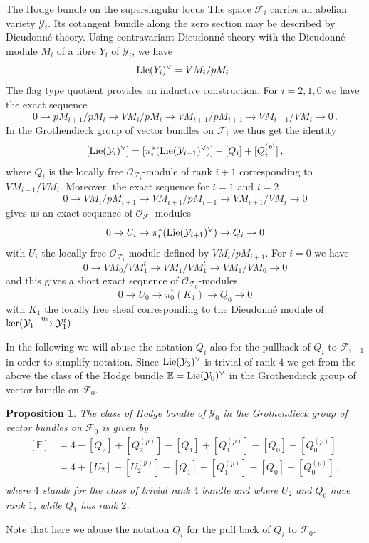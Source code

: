 \documentclass[11pt]{amsart}
\numberwithin{equation}{section}
\newcommand{\EE}{\mathbb E}
\newcommand\langepijl[1]{\buildrel {#1} \over \longrightarrow}
\newtheorem{proposition}[theorem]{Proposition}
\theoremstyle{definition}
\theoremstyle{remark}
\begin{document}
\begin{section}{The Hodge bundle on the supersingular locus}
The space $\mathcal{F}_i$ carries an abelian variety $\mathcal{Y}_i$.
Its cotangent bundle along the zero section may be described by Dieudonn\'e
theory. Using contravariant Dieudonn\'e theory with the Dieudonn\'e module $M_i$
of a fibre $Y_i$ of $\mathcal{Y}_i$, we have
$$
{\rm Lie}(Y_i)^{\vee}=VM_i/pM_i\, .
$$
The flag type quotient provides an inductive construction.
For $i=2,1,0$ we have the
exact sequence
$$
0 \to pM_{i+1}/pM_i \to VM_i/pM_i \to VM_{i+1}/pM_{i+1} \to VM_{i+1}/VM_i \to 0 \, .
$$
In the Grothendieck group of vector bundles on $\mathcal{F}_i$ we thus get the identity
$$
[{\rm Lie}(\mathcal{Y}_i)^{\vee}]=[\pi_i^*({\rm Lie}(\mathcal{Y}_{i+1})^{\vee})] - [Q_i] + [Q_i^{(p)}]\, ,
$$
where $Q_i$ is the locally free $\mathcal{O}_{\mathcal{F}_i}$-module
of rank $i+1$ corresponding to $VM_{i+1}/VM_i$.
Moreover, the exact sequence for $i=1$ and $i=2$
$$
0 \to VM_i/pM_{i+1} \to VM_{i+1}/pM_{i+1} \to VM_{i+1}/VM_i \to 0
$$
gives us an exact sequence of $\mathcal{O}_{\mathcal{F}_i}$-modules
$$
0 \to U_i \to \pi_i^*({\rm Lie}(\mathcal{Y}_{i+1})^{\vee}) \to Q_i \to 0
$$
with $U_i$ the locally free $\mathcal{O}_{\mathcal{F}_i}$-module
defined by  $VM_i/pM_{i+1}$. For $i=0$ we have
$$
0 \to VM_0/VM_1^t \to VM_1/VM_1^t \to VM_1/VM_0 \to 0
$$
and this gives a short exact sequence of $\mathcal{O}_{\mathcal{F}_0}$-modules
$$
0 \to U_0 \to \pi_0^*(K_1) \to Q_0 \to 0
$$
with $K_1$ the locally free sheaf corresponding to the Dieudonn\'e module
of $\ker(\mathcal{Y}_1 \langepijl{\eta_1} \mathcal{Y}_1^t)$.

In the following we will abuse the notation $Q_i$ also for the pullback of $Q_i$
to $\mathcal{F}_{i-1}$ in order to simplify notation.
Since ${\rm Lie}(\mathcal{Y}_3)^{\vee}$ is trivial of rank $4$ we get from the above the
class of the Hodge bundle ${\EE}={\rm Lie}(\mathcal{Y}_0)^{\vee}$ in the Grothendieck group
of vector bundle on $\mathcal{F}_0$.

\begin{proposition}\label{class of EE}
The class of Hodge bundle of $\mathcal{Y}_0$ in the Grothendieck group of
vector bundles on $\mathcal{F}_0$ is given by
$$
\begin{aligned}
 {} [{\EE}] 
& = 4 - [Q_2]+[Q_2^{(p)}]- [Q_1]+[Q_1^{(p)}]-[Q_0]+[Q_0^{(p)}]\\
& = 4 +[U_2]-[U_2^{(p)}]-[Q_1]+[Q_1^{(p)}]-[Q_0]+[Q_0^{(p)}]\, , \\
\end{aligned} 
$$
where $4$ stands for the class of trivial rank $4$ bundle and where
$U_2$ and $Q_0$ have rank $1$, while $Q_1$ has rank $2$.
\end{proposition}
Note that here we abuse the notation $Q_i$ for the pull back of $Q_i$ to $\mathcal{F}_0$.


\end{section}
\end{document}
